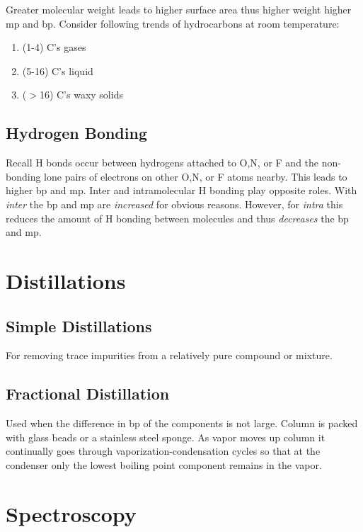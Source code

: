 \documentclass[../OChemReview.tex]{subfiles}
\begin{document}
	Greater molecular weight leads to higher surface area thus higher weight higher mp and bp. Consider following trends of hydrocarbons at room temperature:
	\begin{enumerate}
		\item (1-4) C's gases
		\item (5-16) C's liquid
		\item ($ > $16) C's waxy solids 
	\end{enumerate}
	
	\subsection{Hydrogen Bonding}
	
	Recall H bonds occur between hydrogens attached to O,N, or F and the non-bonding lone pairs of electrons on other O,N, or F atoms nearby. This leads to higher bp and mp. Inter and intramolecular H bonding play opposite roles. With \emph{inter} the bp and mp are \emph{increased} for obvious reasons. However, for \emph{intra} this reduces the amount of H bonding between molecules and thus \emph{decreases} the bp and mp.
	
	\section{Distillations}
	
	\subsection{Simple Distillations}
	
	For removing trace impurities from a relatively pure compound or mixture.
	
	\subsection{Fractional Distillation}
	
	Used when the difference in bp of the components is not large. Column is packed with glass beads or a stainless steel sponge. As vapor moves up column it continually goes through vaporization-condensation cycles so that at the condenser only the lowest boiling point component remains in the vapor.
	
	\section{Spectroscopy}
	
\end{document}
